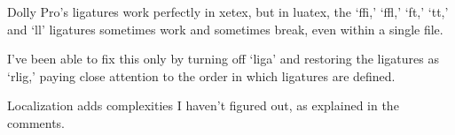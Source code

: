 \documentclass{article}
\begin{document}
Dolly Pro’s ligatures work perfectly in xetex, but in luatex, the
‘ffi,’ ‘ffl,’ ‘ft,’ ‘tt,’ and ‘ll’ ligatures sometimes work and
sometimes break, even within a single file.

I’ve been able to fix this only by turning off ‘liga’ and restoring
the ligatures as ‘rlig,’ paying close attention to the order in which
ligatures are defined.

Localization adds complexities I haven’t figured out, as explained in
the comments.



%
\end{document}
